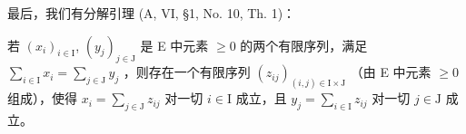 最后，我们有分解引理 (A, VI, §1, No. 10, Th. 1)：

若 \((x_{i})_{i\in \mathrm{I}}\), \((y_{j})_{j\in \mathrm{J}}\) 是 E 中元素 \(\geqslant 0\) 的两个有限序列，满足 \(\sum_{i\in \mathrm{I}}x_i = \sum_{j\in \mathrm{J}}y_j\) ，则存在一个有限序列 \((z_{ij})_{(i,j)\in \mathrm{I}\times \mathrm{J}}\) （由 E 中元素 \(\geqslant 0\) 组成），使得 \(x_{i} = \sum_{j\in \mathrm{J}}z_{ij}\) 对一切 \(i\in \mathrm{I}\) 成立，且 \(y_{j} = \sum_{i\in \mathrm{I}}z_{ij}\) 对一切 \(j\in \mathrm{J}\) 成立。

